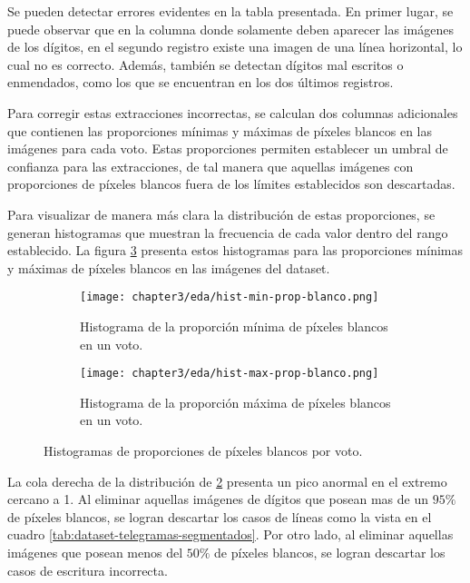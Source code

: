 Se pueden detectar errores evidentes en la tabla presentada. En primer lugar, se puede observar que en la columna donde
solamente deben aparecer las imágenes de los dígitos, en el segundo registro existe una imagen de una línea horizontal,
lo cual no es correcto. Además, también se detectan dígitos mal escritos o enmendados, como los que se encuentran en
los dos últimos registros.

Para corregir estas extracciones incorrectas, se calculan dos columnas adicionales que contienen las proporciones
mínimas y máximas de píxeles blancos en las imágenes para cada voto. Estas proporciones permiten establecer un umbral
de confianza para las extracciones, de tal manera que aquellas imágenes con proporciones de píxeles blancos fuera de
los límites establecidos son descartadas.

Para visualizar de manera más clara la distribución de estas proporciones, se generan histogramas que muestran la
frecuencia de cada valor dentro del rango establecido. La figura \ref{fig:histogramas-min-max-prop-blanco} presenta
estos histogramas para las proporciones mínimas y máximas de píxeles blancos en las imágenes del dataset.

\begin{figure}[H]
    \centering
    \begin{subfigure}[h]{0.48\textwidth}
        \texttt{[image: chapter3/eda/hist-min-prop-blanco.png]}
        \caption{Histograma de la proporción mínima de píxeles blancos en un voto.}
        \label{fig:histograma-min-prop-blanco}
    \end{subfigure}
    \hfill
    \begin{subfigure}[h]{0.48\textwidth}
        \texttt{[image: chapter3/eda/hist-max-prop-blanco.png]}
        \caption{Histograma de la proporción máxima de píxeles blancos en un voto.}
        \label{fig:histograma-max-prop-blanco}
    \end{subfigure}
    \caption[Histogramas de proporciones mínimas y máximas de píxeles blancos por voto]{Histogramas de proporciones de píxeles blancos por voto.}
    \label{fig:histogramas-min-max-prop-blanco}
\end{figure}

La cola derecha de la distribución de \ref{fig:histograma-max-prop-blanco} presenta un pico anormal en el extremo
cercano a 1. Al eliminar aquellas imágenes de dígitos que posean mas de un $95\%$ de píxeles blancos, se logran
descartar los casos de líneas como la vista en el cuadro \ref{tab:dataset-telegramas-segmentados}. Por otro lado, al
eliminar aquellas imágenes que posean menos del $50\%$ de píxeles blancos, se logran descartar los casos de escritura
incorrecta.

